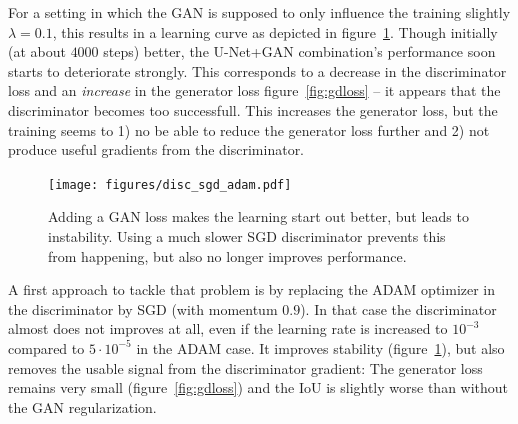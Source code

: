 \documentclass[aps,prl,twocolumn,groupedaddress,amsmath,amssymb]{revtex4-1}
\begin{document}
    For a setting in which the GAN is
    supposed to only influence the training slightly $\lambda=0.1$, this results in a learning curve
    as depicted in figure~\ref{fig:gan_adam}. Though initially (at about $4000$ steps) better, the
    U-Net+GAN combination's performance soon starts to deteriorate strongly. This corresponds to a
    decrease in the discriminator loss and an \emph{increase} in the
    generator loss figure~\ref{fig:gdloss} -- it appears that the discriminator becomes too
    successfull. This  increases the generator loss, but the training seems to 1) no be able to
    reduce the generator  loss further and 2) not produce useful gradients from the discriminator.

    \begin{figure}[tbp]
        \begin{center}
        \texttt{[image: figures/disc\_sgd\_adam.pdf]}
        \end{center}
        \caption{Adding a GAN loss makes the learning start out better, but leads to instability. 
        Using a much slower SGD discriminator prevents this from happening, but also no longer 
        improves performance.}
        \label{fig:gan_adam}
    \end{figure}

    A first approach to tackle that problem is by replacing the ADAM optimizer in the discriminator
    by SGD (with momentum $0.9$). In that case the discriminator almost does not improves at all,
    even if the learning rate is increased to $10^{-3}$ compared to $5\cdot10^{-5}$ in the ADAM
    case.  It improves stability (figure~\ref{fig:gan_adam}), but also removes the usable signal
    from the discriminator gradient: The generator loss remains very small (figure~\ref{fig:gdloss})
    and the IoU is slightly worse than without the GAN regularization.
\end{document}
